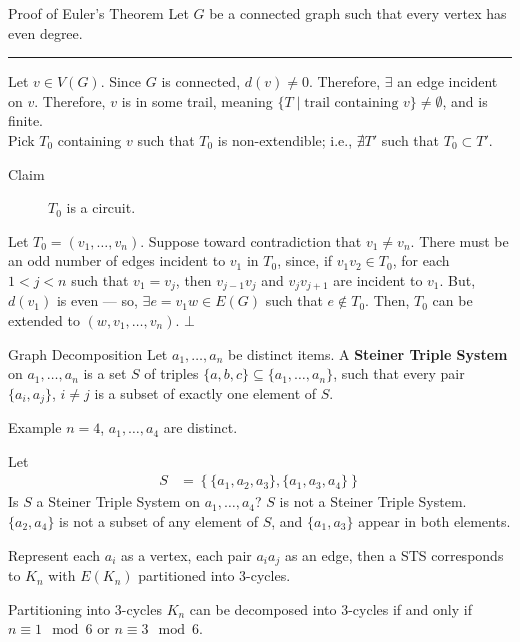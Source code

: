 \documentclass[10pt]{extarticle}
\begin{document}
  \begin{problem}{Proof of Euler's Theorem}
    Let $G$ be a connected graph such that every vertex has even degree.\\
    \vspace{4pt}
    \rule{\textwidth}{0.4pt}
    \vspace{4pt}
    Let $v\in V(G)$. Since $G$ is connected, $d(v) \neq 0$. Therefore, $\exists$ an edge incident on $v$. Therefore, $v$ is in some trail, meaning $\{T\mid \text{trail containing $v$}\} \neq \emptyset$, and is finite.\\

    Pick $T_0$ containing $v$ such that $T_0$ is non-extendible; i.e., $\nexists T'$ such that $T_0\subset T'$.
    \begin{description}
      \item[Claim] $T_0$ is a circuit.
    \end{description}
    Let $T_0 = (v_1,\dots,v_n)$. Suppose toward contradiction that $v_1 \neq v_n$. There must be an odd number of edges incident to $v_1$ in $T_0$, since, if $v_1v_2\in T_0$, for each $1 < j < n$ such that $v_1 = v_j$, then $v_{j-1}v_j$ and $v_{j}v_{j+1}$ are incident to $v_1$. But, $d(v_1)$ is even --- so, $\exists e = v_1w\in E(G)$ such that $e\notin T_0$. Then, $T_0$ can be extended to $(w,v_1,\dots,v_n)$. $\bot$
  \end{problem}
  \begin{problem}{Graph Decomposition}
    Let $a_1,\dots,a_n$ be distinct items. A \textbf{Steiner Triple System} on $a_1,\dots,a_n$ is a set $S$ of triples $\{a,b,c\} \subseteq \{a_1,\dots,a_n\}$, such that every pair $\{a_i,a_j\}$, $i\neq j$ is a subset of exactly one element of $S$.\newline

    \begin{problem}{Example}
      $n=4$, $a_1,\dots,a_4$ are distinct.\newline

      Let
      \begin{align*}
        S &= \left\{\{a_1,a_2,a_3\},\{a_1,a_3,a_4\}\right\}
      \end{align*}
      Is $S$ a Steiner Triple System on $a_1,\dots,a_4$?
      \tcblower
      $S$ is not a Steiner Triple System. $\{a_2,a_4\}$ is not a subset of any element of $S$, and $\{a_1,a_3\}$ appear in both elements.
    \end{problem}
    Represent each $a_i$ as a vertex, each pair $a_ia_j$ as an edge, then a STS corresponds to $K_n$ with $E(K_n)$ partitioned into $3$-cycles.
    \begin{problem}{Partitioning into $3$-cycles}
      $K_n$ can be decomposed into $3$-cycles if and only if $n \equiv 1\mod 6$ or $n \equiv 3\mod 6$.
    \end{problem}
  \end{problem}
\end{document}
